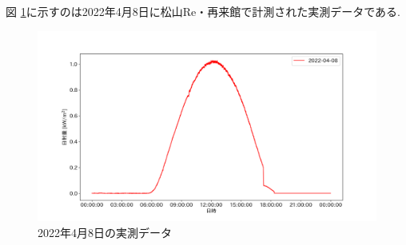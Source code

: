 \documentclass[a4j,12pt,]{jarticle}
\begin{document}


図 \ref{p2}に示すのは2022年4月8日に松山Re・再来館で計測された実測データである.

\begin{figure}[H]
  \begin{center}
    \includegraphics[width=160mm]{real.png}
    \caption{2022年4月8日の実測データ}
    \label{p2}
  \end{center}
\end{figure}
\end{document}
